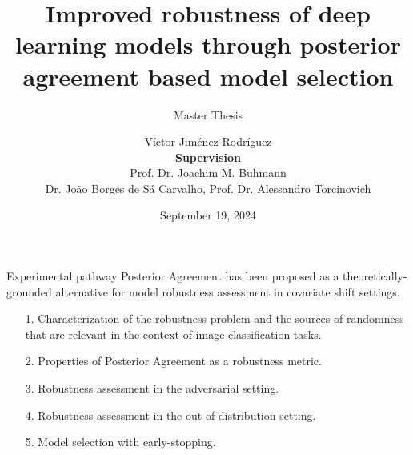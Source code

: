 

\renewcommand{\thefootnote}{\fnsymbol{footnote}}
\newcommand{\mailto}[1]{\href{mailto:#1}{#1}}

\newtheorem{assumption}{Assumption}
\newtheorem{proposition}{Proposition}

\title[
Improved robustness of deep learning models through
posterior agreement based model selection.
]
{Improved robustness of deep learning models through
posterior agreement based model selection}

\subtitle{\vspace{0.1cm} Master Thesis}


\author[Master Thesis -- V\'ictor Jim\'enez Rodr\'iguez]{
	V\'ictor Jim\'enez Rodr\'iguez \\
	\vspace{0.4cm}
	\footnotesize \textbf{Supervision}\\
    \footnotesize Prof. Dr. Joachim M. Buhmann\\
    \footnotesize Dr. Jo\~ao Borges de S\'a Carvalho, Prof. Dr. Alessandro Torcinovich
}

\date{September 19, 2024}


	
\begin{frame}
	\thispagestyle{empty}
	\titlepage
\end{frame}

\begin{frame}{Experimental pathway}
	Posterior Agreement has been proposed as a theoretically-grounded alternative for model
	robustness assessment in covariate shift settings.
	\vspace{0.5cm}
	\begin{itemize}
		\item[1.] Characterization of the robustness problem and the sources of randomness that are relevant in the context
		of image classification tasks.
		\item[2.] Properties of Posterior Agreement as a robustness metric.
		\item[3.] Robustness assessment in the adversarial setting.
		\item[4.] Robustness assessment in the out-of-distribution setting.
		\item[5.] Model selection with early-stopping.   
	\end{itemize}


\end{frame}

